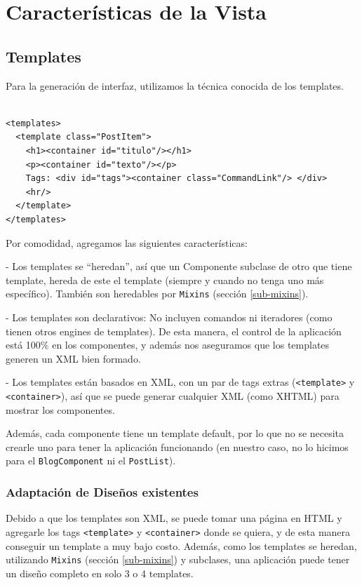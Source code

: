 \section{Características de la Vista}
\label{sec-view}
\subsection{Templates}
\label{sub-templates}
Para la generación de interfaz, utilizamos la técnica conocida de los templates.

\begin{verbatim}

<templates>
  <template class="PostItem">
    <h1><container id="titulo"/></h1>
    <p><container id="texto"/></p>
    Tags: <div id="tags"><container class="CommandLink"/> </div>
    <hr/>
  </template>
</templates>

\end{verbatim}

Por comodidad, agregamos las siguientes características:

- Los templates se ``heredan'', así que un Componente subclase de otro que tiene template, hereda de este el template (siempre y cuando no tenga uno más específico). También son heredables por \verb"Mixins" (sección \ref{sub-mixins}).

- Los templates son declarativos: No incluyen comandos ni iteradores (como tienen otros engines de templates). De esta manera, el control de la aplicación está 100\% en los componentes, y además nos aseguramos que los templates generen un XML bien formado.

- Los templates están basados en XML, con un par de tags extras (\verb"<template>" y \verb"<container>"), así que se puede generar cualquier XML (como XHTML) para mostrar los componentes.

Además, cada componente tiene un template default, por lo que no se necesita crearle uno para tener la aplicación funcionando (en nuestro caso, no lo hicimos para el \verb"BlogComponent" ni el \verb"PostList").

\subsubsection{Adaptación de Diseños existentes}
\label{sub-templates-adapt}
Debido a que los templates son XML, se puede tomar una página en HTML y agregarle los tags \verb"<template>" y \verb"<container>" donde se quiera, y de esta manera conseguir un template a muy bajo costo. Además, como los templates se heredan, utilizando \verb"Mixins" (sección \ref{sub-mixins}) y subclases, una aplicación puede tener un diseño completo en solo 3 o 4 templates.

